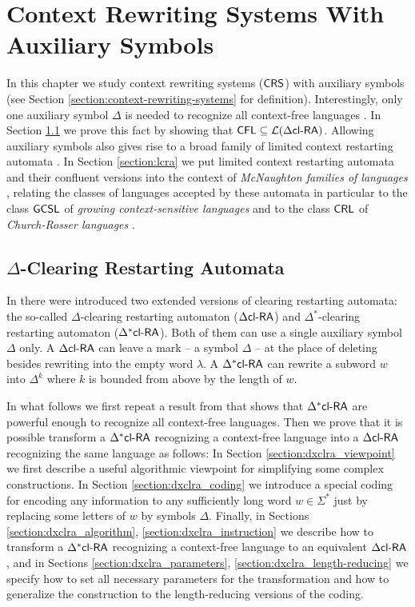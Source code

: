 \chapter{Context Rewriting Systems With Auxiliary Symbols}\label{chapter:crs_aux}

In this chapter we study context rewriting systems ($\textup{\sf CRS\/}$) with auxiliary symbols (see Section \ref{section:context-rewriting-systems} for definition). Interestingly, only one auxiliary symbol $\Delta$ is needed to recognize all context-free languages \cite{CM11}. In Section \ref{section:dxclra} we prove this fact by showing that $\textup{\sf CFL} \subseteq {\cal L}(\textup{\sf $\Delta$cl-RA\/})$. Allowing auxiliary symbols also gives rise to a broad family of limited context restarting automata \cite{B11,OCM13}. In Section \ref{section:lcra} we put limited context restarting automata and their confluent versions into the context of \emph{McNaughton families of languages} \cite{Beaudry2003}, relating the classes of languages accepted by these automata in particular to the class $\textup{\sf GCSL}$ of \emph{growing context-sensitive languages} \cite{Buntrock19981,Dahlhaus1986} and to the class $\textup{\sf CRL}$ of \emph{Church-Rosser languages} \cite{MNO88}.

\section{$\Delta$-Clearing Restarting Automata}\label{section:dxclra}

In \cite{CM10} there were introduced two extended versions of clearing restarting automata: the so-called $\Delta$-clearing restarting automaton ($\textup{\sf $\Delta$cl-RA\/}$) and $\Delta^*$-clearing restarting automaton ($\textup{\sf $\Delta^*$cl-RA\/}$). Both of them can use a single auxiliary symbol $\Delta$ only. A $\textup{\sf $\Delta$cl-RA\/}$ can leave a mark -- a symbol $\Delta$ -- at the place of deleting besides rewriting into the empty word $\lambda$. A $\textup{\sf $\Delta^*$cl-RA\/}$ can rewrite a subword $w$ into $\Delta^k$ where $k$ is bounded from above by the length of $w$. 

In what follows we first repeat a result from \cite{CM10} that shows that $\textup{\sf $\Delta^*$cl-RA\/}$ are powerful enough to recognize  all context-free languages. Then we prove that it is possible transform a $\textup{\sf $\Delta^*$cl-RA\/}$ recognizing a context-free language into a $\textup{\sf $\Delta$cl-RA\/}$ recognizing the same language \cite{CM11, CM11tech} as follows: In Section \ref{section:dxclra_viewpoint} we first describe a useful algorithmic viewpoint for simplifying some complex constructions. In Section \ref{section:dxclra_coding} we introduce a special coding for encoding any information to any sufficiently long word $w \in \Sigma^*$ just by replacing some letters of $w$ by symbols $\Delta$. Finally, in Sections \ref{section:dxclra_algorithm}, \ref{section:dxclra_instruction} we describe how to transform a $\textup{\sf $\Delta^*$cl-RA\/}$ recognizing a context-free language to an equivalent $\textup{\sf $\Delta$cl-RA\/}$, and in Sections \ref{section:dxclra_parameters}, \ref{section:dxclra_length-reducing} we specify how to set all necessary parameters for the transformation and how to generalize the construction to the length-reducing versions of the coding.


